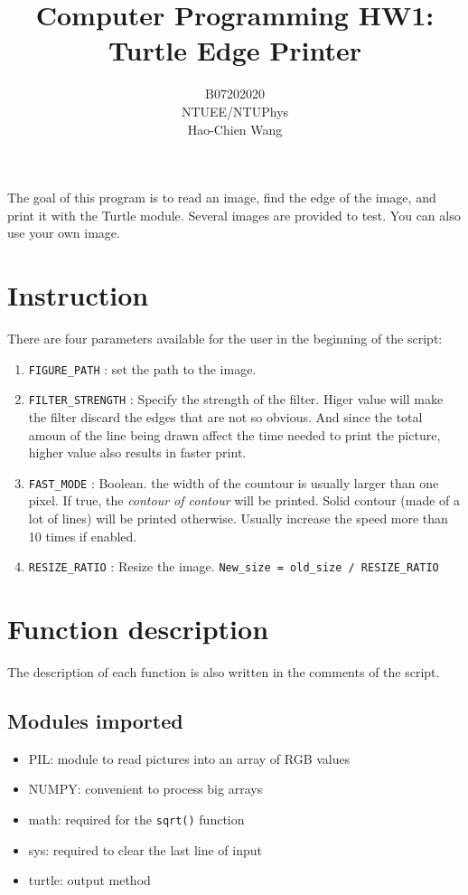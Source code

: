 \documentclass{article}
\title{Computer Programming HW1: Turtle Edge Printer}
\author{B07202020\\
NTUEE/NTUPhys\\
Hao-Chien Wang}
\providecommand{\tightlist}{%
  \setlength{\itemsep}{0pt}\setlength{\parskip}{0pt}}
\begin{document}
\maketitle
The goal of this program is to read an image, find the edge of the
image, and print it with the Turtle module. Several images are provided
to test. You can also use your own image.

\section{Instruction}

There are four parameters available for the user in the beginning of the
script:
\begin{enumerate}
	\item \texttt{FIGURE\_PATH} : set the path to the image.
	\item \texttt{FILTER\_STRENGTH} : Specify the strength of the filter. Higer
value will make the filter discard the edges that are not so obvious.
And since the total amoun of the line being drawn affect the time needed
to print the picture, higher value also results in faster print.
	\item \texttt{FAST\_MODE} : Boolean. the width of the countour is usually
		larger than one pixel. If true, the \textit{contour of contour} will be
printed. Solid contour (made of a lot of lines) will be printed
otherwise. Usually increase the speed more than 10 times if enabled.
	\item \texttt{RESIZE\_RATIO} : Resize the image. \texttt{New\_size\ =\ old\_size\ /\ RESIZE\_RATIO}
\end{enumerate}

\section{Function description}

The description of each function is also written in the comments of the
script.

\subsection{Modules imported}

\begin{itemize}
\tightlist
\item
  PIL: module to read pictures into an array of RGB values
\item
  NUMPY: convenient to process big arrays
\item
  math: required for the \texttt{sqrt()} function
\item
  sys: required to clear the last line of input
\item
  turtle: output method
\end{itemize}
\end{document}
